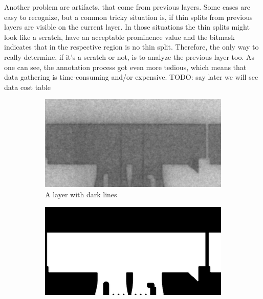Another problem are artifacts, that come from previous layers. Some cases are easy to recognize, but a common tricky situation is, if thin splits from previous layers are visible on the current layer. In those situations the thin splits might look like a scratch, have an acceptable prominence value and the bitmask indicates that in the respective region is no thin split. Therefore, the only way to really determine, if it's a scratch or not, is to analyze the previous layer too. As one can see, the annotation process got even more tedious, which means that data gathering is time-consuming and/or expensive.
TODO: say later we will see data cost table \\

\begin{figure}[!h]
\begin{center}
        \begin{subfigure}{0.6\textwidth}
        \centering
        \includegraphics[width=\textwidth]{images/thin_scratch_previous_layer/layer_00107}
        \caption{A layer with dark lines}
    \end{subfigure}
                \quad
    \begin{subfigure}{0.6\textwidth}
        \includegraphics[width=\textwidth]{images/thin_scratch_previous_layer/bitmask_00107}

\end{subfigure}
\end{center}
\end{figure}
